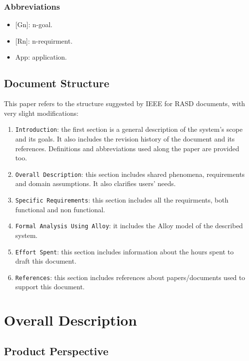 \documentclass[12pt,a4paper]{article}
\begin{document}
	\subsubsection{Abbreviations}
	\begin{itemize}
		\item {[}Gn{]}: n-goal.
		\item {[Rn]}: n-requirment.
		\item {App}: application.
	\end{itemize}
	
	\subsection{Document Structure}
	This paper refers to the structure suggested by IEEE for RASD documents, with very slight modifications:
	\begin{enumerate}
		\item \texttt{Introduction}: the first section is a general description of the system's scope and its goals. It also includes the revision history of the document and its references. Definitions and abbreviations used along the paper are provided too.
		\item \texttt{Overall Description}: this section includes shared phenomena, requirements and domain assumptions. It also clarifies users' needs.
		\item \texttt{Specific Requirements}: this section includes all the requirments, both functional and non functional.
		\item \texttt{Formal Analysis Using Alloy}: it includes the Alloy model of the described system.
		\item \texttt{Effort Spent}: this section includes information about the hours spent to draft this document. 
		\item \texttt{References}: this section includes references about papers/documents used to support this document.
	\end{enumerate}
	
	
	\newpage
	\section{Overall Description}
	
	\subsection{Product Perspective}
	
\end{document}
